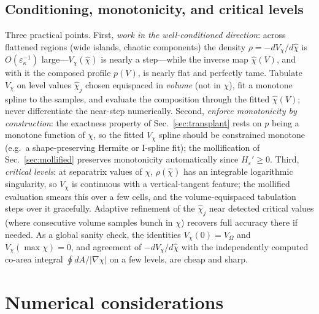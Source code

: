 \documentclass[english]{article}
\begin{document}
\subsection{Conditioning, monotonicity, and critical levels}
\label{sec:Vchi_conditioning}

Three practical points. First, \emph{work in the well-conditioned direction}: across flattened
regions (wide islands, chaotic components) the density $\rho=-dV_\chi/d\hat\chi$ is
$O(\varepsilon_\kappa^{-1})$ large---$V_\chi(\hat\chi)$ is nearly a step---while the inverse map
$\hat\chi(V)$, and with it the composed profile $p(V)$, is nearly flat and perfectly tame.
Tabulate $V_\chi$ on level values $\hat\chi_j$ chosen equispaced in \emph{volume} (not in $\chi$),
fit a monotone spline to the samples, and evaluate the composition through the fitted
$\hat\chi(V)$; never differentiate the near-step numerically. Second, \emph{enforce monotonicity
by construction}: the exactness property of Sec.~\ref{sec:transplant} rests on $p$ being a
monotone function of $\chi$, so the fitted $V_\chi$ spline should be constrained monotone (e.g.\ a
shape-preserving Hermite or I-spline fit); the mollification of Sec.~\ref{sec:mollified} preserves
monotonicity automatically since $H_\varepsilon'\ge0$. Third, \emph{critical levels}: at separatrix
values of $\chi$, $\rho(\hat\chi)$ has an integrable logarithmic singularity, so $V_\chi$ is
continuous with a vertical-tangent feature; the mollified evaluation smears this over a few cells,
and the volume-equispaced tabulation steps over it gracefully. Adaptive refinement of the
$\hat\chi_j$ near detected critical values (where consecutive volume samples bunch in $\chi$)
recovers full accuracy there if needed. As a global sanity check, the identities
$V_\chi(0)=V_\Omega$ and $V_\chi(\max\chi)=0$, and agreement of $-dV_\chi/d\hat\chi$ with the
independently computed co-area integral $\oint dA/|\nabla\chi|$ on a few levels, are cheap and
sharp.

\section{Numerical considerations}
\label{sec:numerics}
\end{document}
